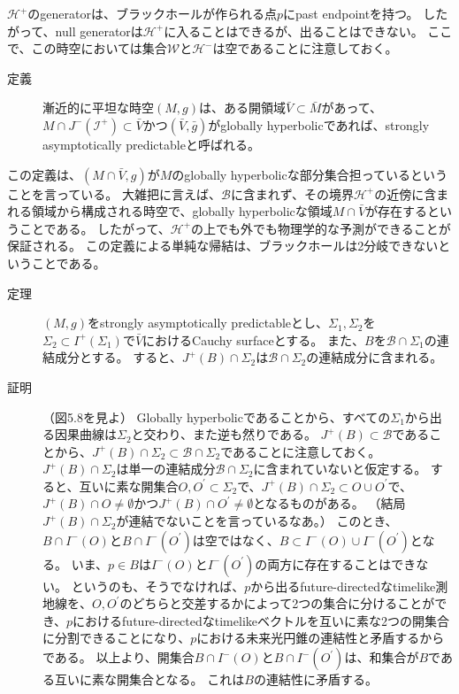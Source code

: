 \documentclass[a4paper, 12pt]{jsarticle}
\begin{document}
$\mathcal{H}^+$のgeneratorは、ブラックホールが作られる点$p$にpast endpointを持つ。
したがって、null generatorは$\mathcal{H}^+$に入ることはできるが、出ることはできない。
ここで、この時空においては集合$\mathcal{W}$と$\mathcal{H}^-$は空であることに注意しておく。

\begin{description}
	\item[定義] 漸近的に平坦な時空$(M, g)$は、ある開領域$\bar{V} \subset \bar{M}$があって、$M \cap J^-(\mathcal{I}^+) \subset \bar{V}$かつ$(\bar{V}, \bar{g})$がglobally hyperbolicであれば、strongly asymptotically predictableと呼ばれる。
\end{description}

この定義は、$(M \cap \bar{V}, g)$が$M$のglobally hyperbolicな部分集合担っているということを言っている。
大雑把に言えば、$\mathcal{B}$に含まれず、その境界$\mathcal{H}^+$の近傍に含まれる領域から構成される時空で、globally hyperbolicな領域$M \cap \bar{V}$が存在するということである。
したがって、$\mathcal{H}^+$の上でも外でも物理学的な予測ができることが保証される。
この定義による単純な帰結は、ブラックホールは2分岐できないということである。

\begin{description}
	\item[定理] $(M, g)$をstrongly asymptotically predictableとし、$\Sigma_1, \Sigma_2$を$\Sigma_2 \subset I^+(\Sigma_1)$で$\bar{V}$におけるCauchy surfaceとする。
	また、$B$を$\mathcal{B} \cap \Sigma_1$の連結成分とする。
	すると、$J^+(B) \cap \Sigma_2$は$\mathcal{B} \cap \Sigma_2$の連結成分に含まれる。

	\item[証明] （図5.8を見よ）
	Globally hyperbolicであることから、すべての$\Sigma_1$から出る因果曲線は$\Sigma_2$と交わり、また逆も然りである。
	$J^+(B) \subset \mathcal{B}$であることから、$J^+(B) \cap \Sigma_2 \subset \mathcal{B} \cap \Sigma_2$であることに注意しておく。
	$J^+(B) \cap \Sigma_2$は単一の連結成分$\mathcal{B} \cap \Sigma_2$に含まれていないと仮定する。
	すると、互いに素な開集合$O, O^{\prime} \subset \Sigma_2$で、$J^+(B) \cap \Sigma_2 \subset O \cup O^{\prime}$で、$J^+(B) \cap O \ne \emptyset$かつ$J^+(B) \cap O^{\prime} \ne \emptyset$となるものがある。
	（結局$J^+(B) \cap \Sigma_2$が連結でないことを言っているなあ。）
	このとき、$B \cap I^-(O)$と$B \cap I^-(O^{\prime})$は空ではなく、$B \subset I^-(O) \cup I^-(O^{\prime})$となる。
	いま、$p \in B$は$I^-(O)$と$I^-(O^{\prime})$の両方に存在することはできない。
	というのも、そうでなければ、$p$から出るfuture-directedなtimelike測地線を、$O, O^{\prime}$のどちらと交差するかによって2つの集合に分けることができ、$p$におけるfuture-directedなtimelikeベクトルを互いに素な2つの開集合に分割できることになり、$p$における未来光円錐の連結性と矛盾するからである。
	以上より、開集合$B \cap I^-(O)$と$B \cap I^-(O^{\prime})$は、和集合が$B$である互いに素な開集合となる。
	これは$B$の連結性に矛盾する。
\end{description}
\end{document}
